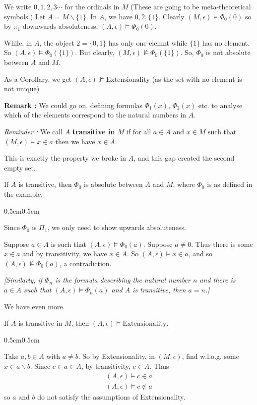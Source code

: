 \documentclass[12pt,a4paper]{article}
\newenvironment{proof}
{\begin{changemargin}{0.5cm}{0.5cm} 
	}%
	{\end{changemargin}
}
\newenvironment{p}
{\begin{proof} 
	}%
	{\end{proof}
}
\begin{document}
\quad We write $0, 1,2,3\cdots$ for the ordinals in $M$ (These are going to be meta-theoretical symbols.) Let $A = M \backslash \{1\}$. In $A$, we have $0,2,\{1\}$. Clearly $(M, \epsilon) \models \Phi_0(0)$ so by $\pi_1$-downwards absoluteness, $(A, \epsilon) \models \Phi_0(0)$.

\quad While, in $A$, the object $2= \{0,1\}$ has only one elemnt while $\{1\}$ has no element. So $(A, \epsilon) \models \Phi_0(\{1\})$. But clearly, $(M, \epsilon) \not\models \Phi_0(\{1\})$. So, $\Phi_0$ is not absolute between $A$ and $M$.

\quad As a Corollary, we get $(A, \epsilon) \not\models \text{Extensionality}$ (as the set with no element is not unique)
\s

\textbf{Remark : } We could go on, defining formulas $\Phi_1(x)$, $\Phi_2(x)$ etc. to analyse which of the elements correspond to the natural numbers in $A$.
\s

\emph{Reminder :} We call $A$ \textbf{transitive in $M$} if for all $a\in A$ and $x\in M$ such that $(M, \epsilon) \models x\in a$ then we have $x\in A$. 

\quad This is exactly the property we broke in $A$, and this gap created the second empty set.
\s

\prop If $A$ is transitive, then $\Phi_0$ is absolute between $A$ and $M$, where $\Phi_0$ is as defined in the example.
\begin{p}
\pf Since $\Phi_0$ is $\Pi_1$, we only need to show upwards absoluteness.

\quad Suppose $a\in A$ is such that $(A, \epsilon) \models \Phi_0(a)$. Suppose $a\neq 0$. Thus there is some $x\in a$ and by transitivity, we have $x\in A$. So $(A, \epsilon) \models x\in a$, and so $(A, \epsilon) \not\models \Phi_0(a)$, a contradiction.

\eop 
\end{p}
\s

\emph{[Similarly, if $\Phi_n$ is the formula describing the natural number $n$ and there is $a\in A$ such that $(A, \epsilon) \models \Phi_n(a)$ and $A$ is transitive, then $a=n$.]}
\s

We have even more.

\prop If $A$ is transitive in $M$, then $(A, \epsilon) \models \text{Extensionality}$.
\begin{p}
\pf Take $a,b\in A$ with $a\neq b$. So by Extensionality, in $(M, \epsilon)$, find w.l.o.g. some $x\in a\backslash b$. Since $c\in a\in A$, by transitivity, $c\in A$. Thus 
\begin{align*}
(A, \epsilon) \models c\in a \\
(A, \epsilon) \models c\not\in a
\end{align*}
so $a$ and $b$ do not satisfy the assumptions of Extensionality.

\eop 
\end{p}
\s
\end{document}
